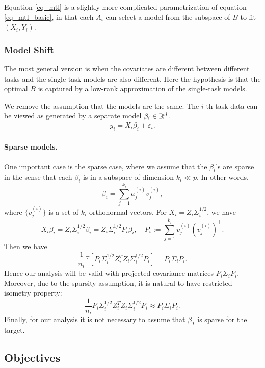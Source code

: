 Equation \eqref{eq_mtl} is a slightly more complicated parametrization of equation \eqref{eq_mtl_basic}, in that each $A_i$ can select a model from the subspace of $B$ to fit $(X_i, Y_i)$.



\subsubsection{Model Shift}

The most general version is when the covariates are different between different tasks and the single-task models are also different.
Here the hypothesis is that the optimal $B$ is captured by a low-rank approximation of the single-task models.


We remove the assumption that the models are the same.
The $i$-th task data can be viewed as generated by a separate model $\beta_i\in\mathbb{R}^d$.
\begin{align}
	y_i = X_i \beta_i + \varepsilon_i.
\end{align}

\paragraph{Sparse models.}
One important case is the sparse case, where we assume that the $\beta_i$'s are sparse in the sense 
that each $\beta_i$ is in a subspace of dimension $k_i\ll p$. In other words,
$$\beta_i = \sum_{j=1}^{k_i} a^{(i)}_j v^{(i)}_j,$$
where $\{v^{(i)}_j\}$ is a set of $k_i$ orthonormal vectors. For $X_i= Z_i \Sigma_i^{1/2}$, we have 
$$ X_i \beta_i = Z_i \Sigma_i^{1/2}\beta_i=  Z_i \Sigma_i^{1/2}P_i\beta_i,\quad P_i:= \sum_{j=1}^{k_i}v_j^{(i)}(v_j^{(i)})^\top.$$
Then we have 
$$\frac{1}{n_i}\mathbb E\left[P_i \Sigma_i^{1/2} Z_i^T Z_i \Sigma_i^{1/2}P_i\right]=P_i \Sigma_i P_i.$$
Hence our analysis will be valid with projected covariance matrices $P_i \Sigma_i P_i$. Moreover, due to the sparsity assumption, it is natural to have restricted isometry property: 
$$\frac{1}{n_i} P_i \Sigma_i^{1/2} Z_i^T Z_i \Sigma_i^{1/2}P_i \approx P_i \Sigma_i P_i.$$
Finally, for our analysis it is not necessary to assume that $\beta_T$ is sparse for the target. 

\subsection{Objectives}

